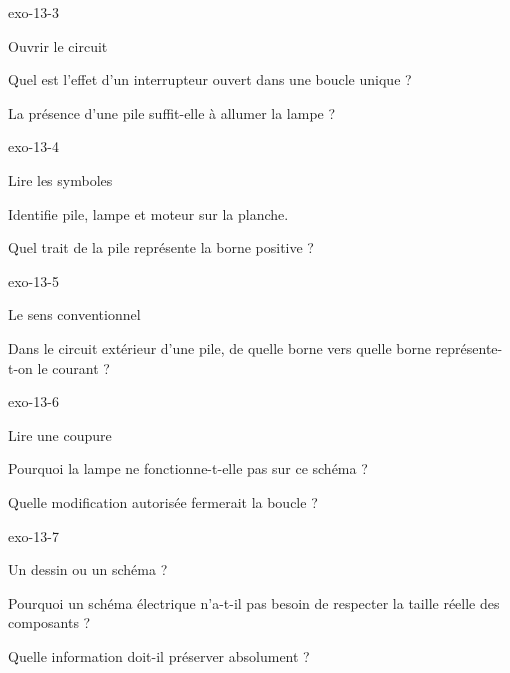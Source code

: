 \documentclass[12pt,twoside,openany]{book}
\begin{document}
\begin{blocLivre}{exo-13-3}
\begin{exercice}[1]{Ouvrir le circuit}
\begin{questions}
\item Quel est l’effet d’un interrupteur ouvert dans une boucle unique ?
\item La présence d’une pile suffit-elle à allumer la lampe ?
\end{questions}
\end{exercice}\end{blocLivre}
\begin{blocLivre}{exo-13-4}
\begin{exercice}[1]{Lire les symboles}
\begin{questions}
\item Identifie pile, lampe et moteur sur la planche.
\item Quel trait de la pile représente la borne positive ?
\end{questions}
\end{exercice}\end{blocLivre}
\begin{blocLivre}{exo-13-5}
\begin{exercice}[1]{Le sens conventionnel}
\begin{questions}
\item Dans le circuit extérieur d’une pile, de quelle borne vers quelle borne représente-t-on le courant ?
\end{questions}
\end{exercice}\end{blocLivre}
\begin{blocLivre}{exo-13-6}
\begin{exercice}[2]{Lire une coupure}
\begin{questions}
\item Pourquoi la lampe ne fonctionne-t-elle pas sur ce schéma ?
\item Quelle modification autorisée fermerait la boucle ?
\end{questions}
\end{exercice}\end{blocLivre}
\begin{blocLivre}{exo-13-7}
\begin{exercice}[2]{Un dessin ou un schéma ?}
\begin{questions}
\item Pourquoi un schéma électrique n’a-t-il pas besoin de respecter la taille réelle des composants ?
\item Quelle information doit-il préserver absolument ?
\end{questions}
\end{exercice}\end{blocLivre}
\end{document}
